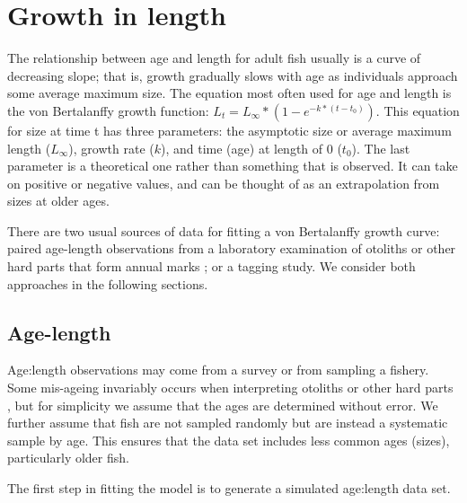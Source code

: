 \documentclass[
]{krantz}
\begin{document}
\hypertarget{vonBert}{%
\section{Growth in length}\label{vonBert}}

The relationship between age and length for adult fish usually is a curve of decreasing slope; that is, growth gradually slows with age as individuals approach some average maximum size. The equation most often used for age and length is the von Bertalanffy growth function: \(L_t=L_\infty*(1-e^{-k*(t-t_0)})\). This equation for size at time t has three parameters: the asymptotic size or average maximum length (\(L_\infty\)), growth rate (\(k\)), and time (age) at length of 0 (\(t_0\)). The last parameter is a theoretical one rather than something that is observed. It can take on positive or negative values, and can be thought of as an extrapolation from sizes at older ages.

There are two usual sources of data for fitting a von Bertalanffy growth curve: paired age-length observations from a laboratory examination of otoliths or other hard parts that form annual marks \citep{campana2001}; or a tagging study. We consider both approaches in the following sections.

\hypertarget{Otolith}{%
\subsection{Age-length}\label{Otolith}}

Age:length observations may come from a survey or from sampling a fishery. Some mis-ageing invariably occurs when interpreting otoliths or other hard parts \citep{campana2001}, but for simplicity we assume that the ages are determined without error. We further assume that fish are not sampled randomly but are instead a systematic sample by age. This ensures that the data set includes less common ages (sizes), particularly older fish.

The first step in fitting the model is to generate a simulated age:length data set.
\end{document}
